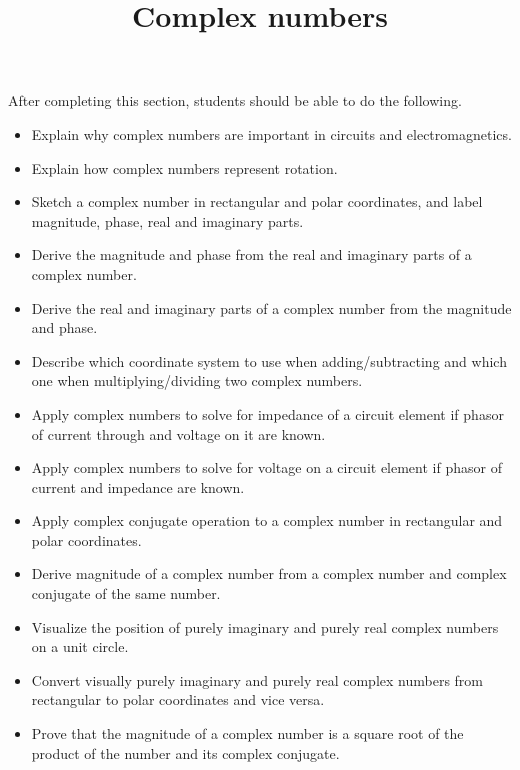 \documentclass{ximera}
\title{Complex numbers}
\begin{document}
\begin{abstract}
\end{abstract}

\maketitle

\begin{sectionOutcomes}

After completing this section, students should be able to do the following.

\begin{itemize}
\item Explain why complex numbers are important in circuits and electromagnetics.
\item Explain how complex numbers represent rotation.
\item Sketch a complex number in rectangular and polar coordinates, and label magnitude, phase, real and imaginary parts.
\item Derive the magnitude and phase from the real and imaginary parts of a complex number.
\item Derive the real and imaginary parts of a complex number from the magnitude and phase.
\item Describe which coordinate system to use when adding/subtracting and which one when multiplying/dividing two complex numbers.
\item Apply complex numbers to solve for impedance of a circuit element if phasor of current through and voltage on it are known.
\item Apply complex numbers to solve for voltage on a circuit element if phasor of current and impedance are known.
\item Apply complex conjugate operation to a complex number in rectangular and polar coordinates.
\item Derive magnitude of a complex number from a complex number and complex conjugate of the same number.
\item Visualize the position of  purely imaginary and purely real complex numbers on a unit circle.
\item Convert visually purely imaginary and purely real complex numbers from rectangular to polar coordinates and vice versa.
\item Prove that the magnitude of a complex number is a square root of the product of the number and its complex conjugate.
\end{itemize}

\end{sectionOutcomes}
\end{document}

